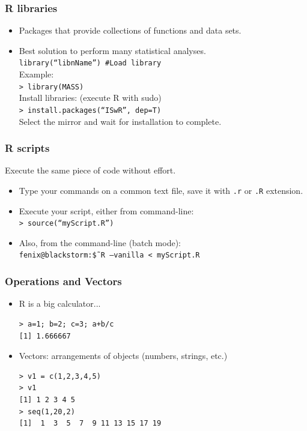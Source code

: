 \documentclass{beamer}
\begin{document}
\begin{frame}

 \frametitle{R libraries}
 \begin{itemize}
  \item Packages that provide collections of functions
  and data sets.
  \item Best solution to perform many statistical
 analyses.\\
  \texttt{library(``libnName'') \#Load library}\\
  Example:\\
  \texttt{> library(MASS)}\\
  Install libraries: (execute R with sudo)\\
  \texttt{> install.packages(``ISwR'', dep=T)}\\
  Select the mirror and wait for installation to complete.
 \end{itemize}

\end{frame}


\begin{frame}

 \frametitle{R scripts}
 Execute the same piece of code without effort.
 \begin{itemize}
  \item Type your commands on a common text
  file, save it with \texttt{.r} or \texttt{.R} extension.
  \item Execute your script, either from command-line:\\
  \texttt{> source(``myScript.R'')}
  \item Also, from the command-line (batch mode):\\
  \texttt{fenix@blackstorm:\~\$ R --vanilla < myScript.R}
 \end{itemize}

\end{frame}


\begin{frame}[fragile]

\frametitle{Operations and Vectors}
\begin{itemize}
 \item R is a big calculator...\\
 \begin{verbatim}
> a=1; b=2; c=3; a+b/c
[1] 1.666667
  \end{verbatim} 
  \vspace{-0.5cm}
  \item Vectors: arrangements of objects (numbers, strings, etc.)\\
  \begin{verbatim}
> v1 = c(1,2,3,4,5)
> v1
[1] 1 2 3 4 5
> seq(1,20,2)
[1]  1  3  5  7  9 11 13 15 17 19
  \end{verbatim}
  \end{itemize}

\end{frame}
\end{document}

